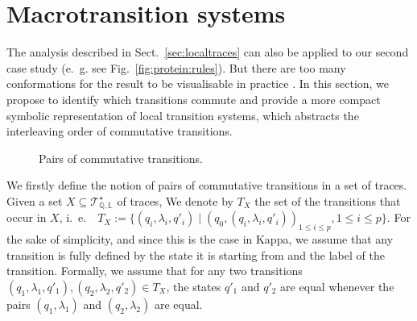 \documentclass[10pt,a4paper]{llncs}
\newcommand{\bydef}{\stackrel{\scalebox{0.8}{\!\!$\scriptscriptstyle{\triangle}$}}{=}}
\renewcommand{\bydef}{:=}
\newcommand{\ie}{i.~e.~}
\newcommand{\states}{\mathbb{Q}}
\newcommand{\labels}{\mathbb{L}}
\newcommand{\eg}{e.~g.}
\newcommand{\transitions}[1][X]{T_{#1}}
\newcommand{\traces}[1][\states,\labels]{\mathcal{T}^{\star}_{#1}}
\newcommand{\beforesection}{\vspace*{-4pt}}
\renewcommand{\beforesection}{}
\begin{document}
\beforesection

\section{Macrotransition systems}
\label{sec:macro}

\beforesection

The analysis described in Sect.~\ref{sec:localtraces} can also be applied
to our second  case study ({\eg} see Fig.~\ref{fig:protein:rules}).
But there are too many conformations for the result to be %
visualisable in practice%
. In this section, we propose to identify which transitions commute and provide a more compact symbolic representation of local transition systems, which abstracts the interleaving order of commutative  transitions.

\begin{figure}[t]
\hfill%
\caption{Pairs of commutative transitions.}
\end{figure}

We firstly define the notion of pairs of commutative transitions in a set of traces.  %
Given a set $X\subseteq\traces$ of traces,
We denote by $\transitions$ the set of the transitions that occur in $X$, \ie~$\transitions\bydef \{(q_i,\lambda_i,q'_i)\;|\;(q_0,(q_i,\lambda_i,q'_i))_{1\leq i \leq p}, 1\leq i \leq p\}$. For the sake of simplicity, and since this is the case in Kappa, we assume that any transition %
 is fully defined by the state it is starting from and the label of the transition. Formally, we assume that for any two transitions $(q_1,\lambda_1,q'_1),(q_2,\lambda_2,q'_2)\in\transitions$, the states $q'_1$ and $q'_2$ are equal whenever the pairs $(q_1,\lambda_1)$ and $(q_2,\lambda_2)$ are equal.
\end{document}
